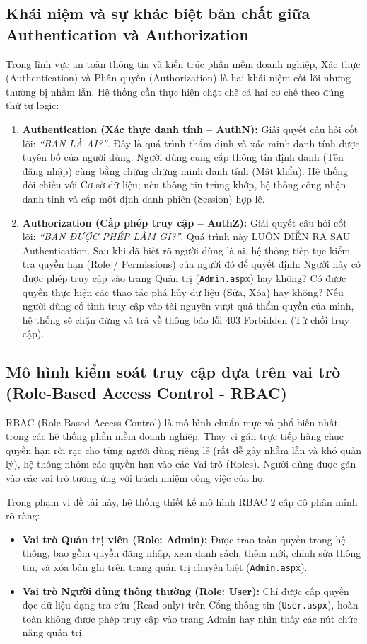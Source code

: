 \documentclass[12pt,a4paper]{report}
\begin{document}
\subsection{Khái niệm và sự khác biệt bản chất giữa Authentication và Authorization}
Trong lĩnh vực an toàn thông tin và kiến trúc phần mềm doanh nghiệp, Xác thực (Authentication) và Phân quyền (Authorization) là hai khái niệm cốt lõi nhưng thường bị nhầm lẫn. Hệ thống cần thực hiện chặt chẽ cả hai cơ chế theo đúng thứ tự logic:
\begin{enumerate}
    \item \textbf{Authentication (Xác thực danh tính -- AuthN):} Giải quyết câu hỏi cốt lõi: \textit{“BẠN LÀ AI?”}. Đây là quá trình thẩm định và xác minh danh tính được tuyên bố của người dùng. Người dùng cung cấp thông tin định danh (Tên đăng nhập) cùng bằng chứng chứng minh danh tính (Mật khẩu). Hệ thống đối chiếu với Cơ sở dữ liệu; nếu thông tin trùng khớp, hệ thống công nhận danh tính và cấp một định danh phiên (Session) hợp lệ.
    \item \textbf{Authorization (Cấp phép truy cập -- AuthZ):} Giải quyết câu hỏi cốt lõi: \textit{“BẠN ĐƯỢC PHÉP LÀM GÌ?”}. Quá trình này LUÔN DIỄN RA SAU Authentication. Sau khi đã biết rõ người dùng là ai, hệ thống tiếp tục kiểm tra quyền hạn (Role / Permissions) của người đó để quyết định: Người này có được phép truy cập vào trang Quản trị (\texttt{Admin.aspx}) hay không? Có được quyền thực hiện các thao tác phá hủy dữ liệu (Sửa, Xóa) hay không? Nếu người dùng cố tình truy cập vào tài nguyên vượt quá thẩm quyền của mình, hệ thống sẽ chặn đứng và trả về thông báo lỗi 403 Forbidden (Từ chối truy cập).
\end{enumerate}

\subsection{Mô hình kiểm soát truy cập dựa trên vai trò (Role-Based Access Control - RBAC)}
RBAC (Role-Based Access Control) là mô hình chuẩn mực và phổ biến nhất trong các hệ thống phần mềm doanh nghiệp. Thay vì gán trực tiếp hàng chục quyền hạn rời rạc cho từng người dùng riêng lẻ (rất dễ gây nhầm lẫn và khó quản lý), hệ thống nhóm các quyền hạn vào các Vai trò (Roles). Người dùng được gán vào các vai trò tương ứng với trách nhiệm công việc của họ.

Trong phạm vi đề tài này, hệ thống thiết kế mô hình RBAC 2 cấp độ phân minh rõ ràng:
\begin{itemize}
    \item \textbf{Vai trò Quản trị viên (Role: Admin):} Được trao toàn quyền trong hệ thống, bao gồm quyền đăng nhập, xem danh sách, thêm mới, chỉnh sửa thông tin, và xóa bản ghi trên trang quản trị chuyên biệt (\texttt{Admin.aspx}).
    \item \textbf{Vai trò Người dùng thông thường (Role: User):} Chỉ được cấp quyền đọc dữ liệu dạng tra cứu (Read-only) trên Cổng thông tin (\texttt{User.aspx}), hoàn toàn không được phép truy cập vào trang Admin hay nhìn thấy các nút chức năng quản trị.
\end{itemize}
\end{document}
